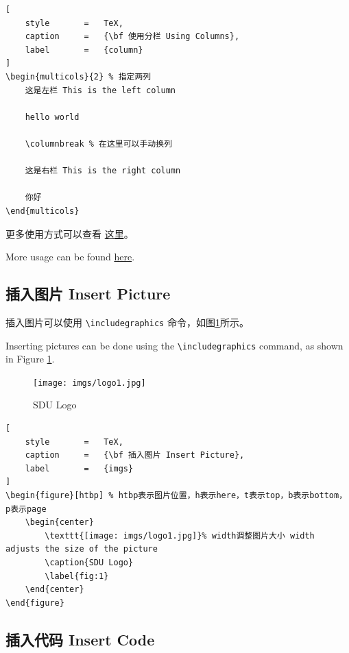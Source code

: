 \documentclass{article}
\begin{document}
\begin{lstlisting}[
    style       =   TeX,
    caption     =   {\bf 使用分栏 Using Columns},
    label       =   {column}
]
\begin{multicols}{2} % 指定两列
    这是左栏 This is the left column

    hello world

    \columnbreak % 在这里可以手动换列

    这是右栏 This is the right column

    你好
\end{multicols}
\end{lstlisting}

更多使用方式可以查看 \href{https://www.overleaf.com/learn/latex/Multiple_columns}{这里}。

More usage can be found \href{https://www.overleaf.com/learn/latex/Multiple_columns}{here}.


\subsection{插入图片 Insert Picture}

插入图片可以使用 \verb|\includegraphics| 命令，如图\ref{fig:1}所示。

Inserting pictures can be done using the \verb|\includegraphics| command, as shown in Figure \ref{fig:1}.

\clearpage

\begin{figure}[htbp]
    \begin{center}
        \texttt{[image: imgs/logo1.jpg]}
        \caption{SDU Logo}
        \label{fig:1}
    \end{center}
\end{figure}

\begin{lstlisting}[
    style       =   TeX,
    caption     =   {\bf 插入图片 Insert Picture},
    label       =   {imgs}
]
\begin{figure}[htbp] % htbp表示图片位置，h表示here，t表示top，b表示bottom，p表示page
    \begin{center}
        \texttt{[image: imgs/logo1.jpg]}% width调整图片大小 width adjusts the size of the picture
        \caption{SDU Logo}
        \label{fig:1}
    \end{center}
\end{figure}
\end{lstlisting}


\subsection{插入代码 Insert Code}
\end{document}
